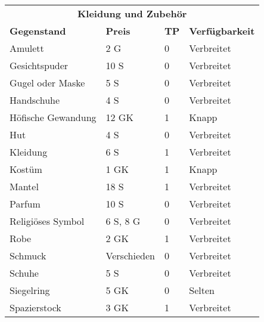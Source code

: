 \documentclass[a4paper, 9pt]{scrreprt}
\begin{document}
\begin{table}[!ht]
    \renewcommand{\arraystretch}{1.2}
    \begin{tabular}{llll}
        \multicolumn{4}{c}{\cellcolor{gray!25}\textbf{Kleidung und Zubehör}}        \\
        \textbf{Gegenstand} & \textbf{Preis} & \textbf{TP} & \textbf{Verfügbarkeit} \\ \hline
        Amulett             & 2 G            & 0           & Verbreitet             \\ \hline
        Gesichtspuder       & 10 S           & 0           & Verbreitet             \\ \hline
        Gugel oder Maske    & 5 S            & 0           & Verbreitet             \\ \hline
        Handschuhe          & 4 S            & 0           & Verbreitet             \\ \hline
        Höfische Gewandung  & 12 GK          & 1           & Knapp                  \\ \hline
        Hut                 & 4 S            & 0           & Verbreitet             \\ \hline
        Kleidung            & 6 S            & 1           & Verbreitet             \\ \hline
        Kostüm              & 1 GK           & 1           & Knapp                  \\ \hline
        Mantel              & 18 S           & 1           & Verbreitet             \\ \hline
        Parfum              & 10 S           & 0           & Verbreitet             \\ \hline
        Religiöses Symbol   & 6 S, 8 G       & 0           & Verbreitet             \\ \hline
        Robe                & 2 GK           & 1           & Verbreitet             \\ \hline
        Schmuck             & Verschieden    & 0           & Verbreitet             \\ \hline
        Schuhe              & 5 S            & 0           & Verbreitet             \\ \hline
        Siegelring          & 5 GK           & 0           & Selten                 \\ \hline
        Spazierstock        & 3 GK           & 1           & Verbreitet             \\ \hline

\end{tabular}
\end{table}
\end{document}
